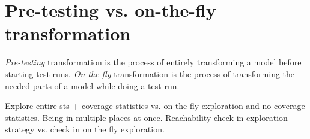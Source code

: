 \section{Pre-testing vs. on-the-fly transformation}

\textit{Pre-testing} transformation is the process of entirely transforming a model before starting test runs. \textit{On-the-fly} transformation is the process of transforming the needed parts of a model while doing a test run.

Explore entire sts + coverage statistics vs. on the fly exploration and no coverage statistics. Being in multiple places at once.
Reachability check in exploration strategy vs. check in on the fly exploration.

